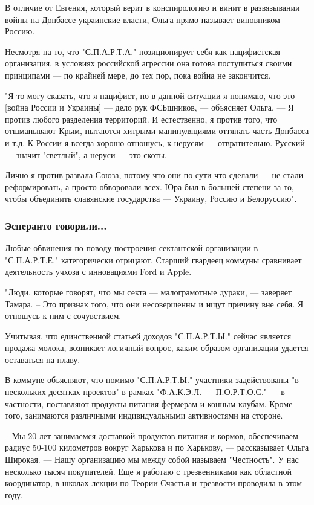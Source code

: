 В отличие от Евгения, который верит в конспирологию и винит в развязывании
войны на Донбассе украинские власти, Ольга прямо называет виновником Россию. 

Несмотря на то, что "С.П.А.Р.Т.А." позиционирует себя как пацифистская
организация, в условиях российской агрессии она готова поступиться своими
принципами --- по крайней мере, до тех пор, пока война не закончится.

"Я-то могу сказать, что я пацифист, но в данной ситуации я понимаю, что это
[война России и Украины] --- дело рук ФСБшников, --- объясняет Ольга. --- Я против
любого разделения территорий. И естественно, я против того, что отшманывают
Крым, пытаются хитрыми манипуляциями оттяпать часть Донбасса и т.д. К России я
всегда хорошо отношусь, к нерусям --- отвратительно. Русский --- значит "светлый",
а неруси --- это скоты. 

Лично я против развала Союза, потому что они по сути что сделали --- не стали
реформировать, а просто обворовали всех. Юра был в большей степени за то, чтобы
объединить славянские государства --- Украину, Россию и Белоруссию".

\subsubsection{Эсперанто говорили...}

Любые обвинения по поводу построения сектантской организации в "С.П.А.Р.Т.Е."
категорически отрицают. Старший гвардеец коммуны сравнивает деятельность учхоза
с инновациями Ford и Apple.

"Люди, которые говорят, что мы секта --- малограмотные дураки, --- заверяет Тамара.
– Это признак того, что они несовершенны и ищут причину вне себя. Я отношусь к
ним с сочувствием.

Учитывая, что единственной статьей доходов "С.П.А.Р.Т.Ы." сейчас является
продажа молока, возникает логичный вопрос, каким образом организации удается
оставаться на плаву. 

В коммуне объясняют, что помимо "С.П.А.Р.Т.Ы." участники задействованы "в
нескольких десятках проектов" в рамках "Ф.А.К.Э.Л. --- П.О.Р.Т.О.С." --- в
частности, поставляют продукты питания фермерам и конным клубам. Кроме того,
занимаются различными индивидуальными активностями на стороне.

– Мы 20 лет занимаемся доставкой продуктов питания и кормов, обеспечиваем
радиус 50-100 километров вокруг Харькова и по Харькову, --- рассказывает Ольга
Широкая. --- Нашу организацию мы между собой называем "Честность". У нас
несколько тысяч покупателей. Еще я работаю с трезвенниками как областной
координатор, в школах лекции по Теории Счастья и трезвости проводила в этом
году.


